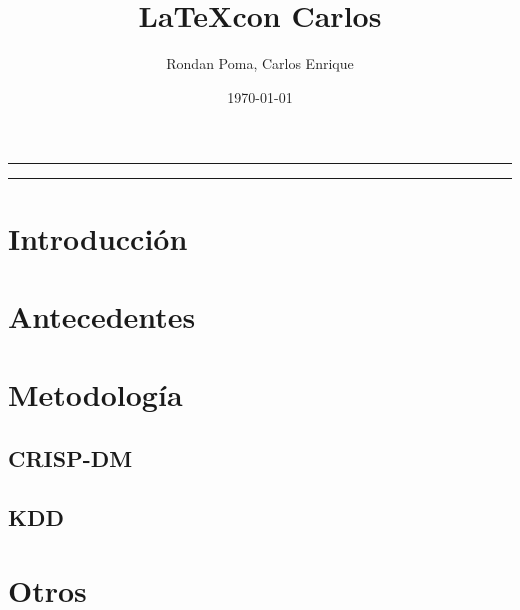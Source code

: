 \documentclass[10pt,a4paper]{article}
\author{Rondan Poma, Carlos Enrique}
\title{\LaTeX con Carlos}
\date{\today}
\begin{document}
	\maketitle
	\begin{center}
		\rule{15cm}{1pt}
		\begin{abstract}
			\lipsum[1] 
		\end{abstract}
		\rule{15cm}{1pt}
	\end{center}
	\tableofcontents
	\vspace{1cm}
	\begin{multicols}{2}
		
		\section{Introducción}
		\lipsum[2-6]
		\section{Antecedentes}
		\lipsum[2-8]
		\section{Metodología}
		\subsection{CRISP-DM}
		\lipsum[2-6]
		\subsection{KDD}
		\lipsum[2-6]
		\section{Otros}
		\lipsum[2-6]
		
	\end{multicols}
	
\end{document}
